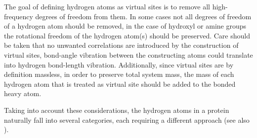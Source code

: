 The goal of defining hydrogen atoms as virtual sites is to remove all
high-frequency degrees of freedom from them. In some cases not all
degrees of freedom of a hydrogen atom should be removed, {\eg} in the
case of hydroxyl or amine groups the rotational freedom of the
hydrogen atom(s) should be preserved. Care should be taken that no
unwanted correlations are introduced by the construction of virtual
sites, {\eg} bond-angle vibration between the constructing atoms could
translate into hydrogen bond-length vibration. Additionally, since
virtual sites are by definition massless, in order to preserve total
system mass, the mass of each hydrogen atom that is treated as virtual
site should be added to the bonded heavy atom.

Taking into account these considerations, the hydrogen atoms in a
protein naturally fall into several categories, each requiring a
different approach (see also ).

